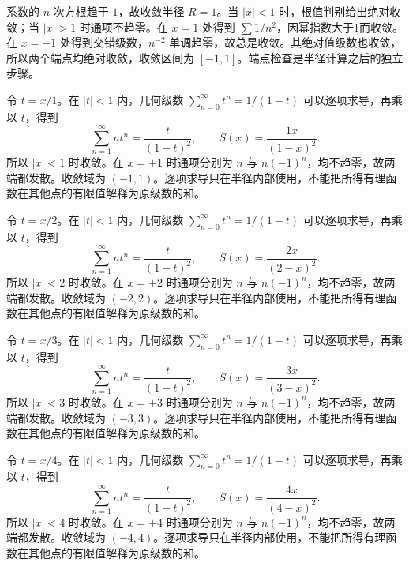 \documentclass[12pt,fontset=fandol]{ctexart}
\begin{document}
\begin{solve}\label{ans:c26q7}
系数的 $n$ 次方根趋于 $1$，故收敛半径 $R=1$。当 $|x|<1$ 时，根值判别给出绝对收敛；当 $|x|>1$ 时通项不趋零。在 $x=1$ 处得到 $\sum1/n^{2}$，因幂指数大于1而收敛。在 $x=-1$ 处得到交错级数，$n^{-2}$ 单调趋零，故总是收敛。其绝对值级数也收敛，所以两个端点均绝对收敛，收敛区间为 $[-1,1]$。端点检查是半径计算之后的独立步骤。
\end{solve}

\begin{solve}\label{ans:c26q8}
令 $t=x/1$。在 $|t|<1$ 内，几何级数 $\sum_{n=0}^\infty t^n=1/(1-t)$ 可以逐项求导，再乘以 $t$，得到
\[
\sum_{n=1}^\infty nt^n=\frac{t}{(1-t)^2},\qquad S(x)=\frac{1x}{(1-x)^2}.
\]
所以 $|x|<1$ 时收敛。在 $x=\pm 1$ 时通项分别为 $n$ 与 $n(-1)^n$，均不趋零，故两端都发散。收敛域为 $(-1,1)$。逐项求导只在半径内部使用，不能把所得有理函数在其他点的有限值解释为原级数的和。
\end{solve}

\begin{solve}\label{ans:c26q9}
令 $t=x/2$。在 $|t|<1$ 内，几何级数 $\sum_{n=0}^\infty t^n=1/(1-t)$ 可以逐项求导，再乘以 $t$，得到
\[
\sum_{n=1}^\infty nt^n=\frac{t}{(1-t)^2},\qquad S(x)=\frac{2x}{(2-x)^2}.
\]
所以 $|x|<2$ 时收敛。在 $x=\pm 2$ 时通项分别为 $n$ 与 $n(-1)^n$，均不趋零，故两端都发散。收敛域为 $(-2,2)$。逐项求导只在半径内部使用，不能把所得有理函数在其他点的有限值解释为原级数的和。
\end{solve}

\begin{solve}\label{ans:c26q10}
令 $t=x/3$。在 $|t|<1$ 内，几何级数 $\sum_{n=0}^\infty t^n=1/(1-t)$ 可以逐项求导，再乘以 $t$，得到
\[
\sum_{n=1}^\infty nt^n=\frac{t}{(1-t)^2},\qquad S(x)=\frac{3x}{(3-x)^2}.
\]
所以 $|x|<3$ 时收敛。在 $x=\pm 3$ 时通项分别为 $n$ 与 $n(-1)^n$，均不趋零，故两端都发散。收敛域为 $(-3,3)$。逐项求导只在半径内部使用，不能把所得有理函数在其他点的有限值解释为原级数的和。
\end{solve}

\begin{solve}\label{ans:c26q11}
令 $t=x/4$。在 $|t|<1$ 内，几何级数 $\sum_{n=0}^\infty t^n=1/(1-t)$ 可以逐项求导，再乘以 $t$，得到
\[
\sum_{n=1}^\infty nt^n=\frac{t}{(1-t)^2},\qquad S(x)=\frac{4x}{(4-x)^2}.
\]
所以 $|x|<4$ 时收敛。在 $x=\pm 4$ 时通项分别为 $n$ 与 $n(-1)^n$，均不趋零，故两端都发散。收敛域为 $(-4,4)$。逐项求导只在半径内部使用，不能把所得有理函数在其他点的有限值解释为原级数的和。
\end{solve}
\end{document}
